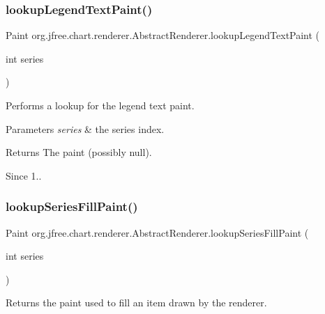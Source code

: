 \subsubsection{\texorpdfstring{lookup\+Legend\+Text\+Paint()}{lookupLegendTextPaint()}}
{\footnotesize\ttfamily Paint org.\+jfree.\+chart.\+renderer.\+Abstract\+Renderer.\+lookup\+Legend\+Text\+Paint (\begin{DoxyParamCaption}\item[{int}]{series }\end{DoxyParamCaption})}

Performs a lookup for the legend text paint.


\begin{DoxyParams}{Parameters}
{\em series} & the series index.\\
\hline
\end{DoxyParams}
\begin{DoxyReturn}{Returns}
The paint (possibly {\ttfamily null}).
\end{DoxyReturn}
\begin{DoxySince}{Since}
1.. 
\end{DoxySince}
\mbox{\label{classorg_1_1jfree_1_1chart_1_1renderer_1_1_abstract_renderer_a12a702d7b43fac8d70b5c55c03b492fc}} 
\subsubsection{\texorpdfstring{lookup\+Series\+Fill\+Paint()}{lookupSeriesFillPaint()}}
{\footnotesize\ttfamily Paint org.\+jfree.\+chart.\+renderer.\+Abstract\+Renderer.\+lookup\+Series\+Fill\+Paint (\begin{DoxyParamCaption}\item[{int}]{series }\end{DoxyParamCaption})}

Returns the paint used to fill an item drawn by the renderer.


